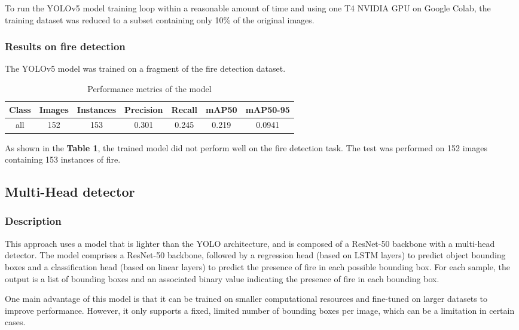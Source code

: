 \documentclass{article}
\begin{document}
To run the YOLOv5 model training loop within a reasonable amount of time and using one T4 NVIDIA GPU on Google Colab, the training dataset was reduced to a subset containing only 10\% of the original images.

\subsubsection{Results on fire detection}

The YOLOv5 model was trained on a fragment of the fire detection dataset.

\begin{table}[ht]
    \centering
    \begin{tabular}{|c|c|c|c|c|c|c|}
    \hline
    Class & Images & Instances & Precision & Recall & mAP50 & mAP50-95 \\ 
    \hline
    all & 152 & 153 & 0.301 & 0.245 & 0.219 & 0.0941 \\ 
    \hline
    \end{tabular}
    \caption{Performance metrics of the model}
    \label{table:first_table}
\end{table}

As shown in the \textbf{Table 1}, the trained model did not perform well on the fire detection task. The test was performed on 152 images containing 153 instances of fire.

\newpage

\subsection{Multi-Head detector}

\subsubsection{Description}

This approach uses a model that is lighter than the YOLO architecture, and is composed of a ResNet-50 backbone with a multi-head detector. The model comprises a ResNet-50 backbone, followed by a regression head (based on LSTM layers) to predict object bounding boxes and a classification head (based on linear layers) to predict the presence of fire in each possible bounding box.
For each sample, the output is a list of bounding boxes and an associated binary value indicating the presence of fire in each bounding box.

One main advantage of this model is that it can be trained on smaller computational resources and fine-tuned on larger datasets to improve performance. However, it only supports a fixed, limited number of bounding boxes per image, which can be a limitation in certain cases.
\end{document}
